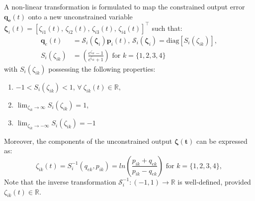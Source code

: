 \documentclass[lettersize,journal]{IEEEtran}
\begin{document}
A non-linear transformation is formulated to map the constrained output error $\boldsymbol{q_e}(t)$ onto a new unconstrained variable $\boldsymbol{\zeta}_i(t) = [\zeta_{i 1}(t),\, \zeta_{i 2}(t),\, \zeta_{i 3}(t),\, \zeta_{i 4}(t)]^{\top}$ such that:
\begin{align}
    \label{error transformation for inner loop: equation}
    \boldsymbol{q}_{e}(t) &= \mathcal{S}_i(\boldsymbol{\zeta}_i) \boldsymbol{p}_i(t), \, \mathcal{S}_i(\boldsymbol{\zeta}_i) = \text{diag}[S_i(\zeta_{ik})], \nonumber \\
    S_i(\zeta_{ik}) &= \left(\frac{e^{\zeta_{ik}} - 1}{e^{\zeta_{ik}} + 1} \right) \text{ for } k = \{1, 2, 3, 4\}
\end{align}
with $S_i(\zeta_{ik})$ possessing the following properties:
\begin{enumerate}
    \item[I.] $ -1 < S_i(\zeta_{ik}) < 1 $, $\forall~\zeta_{ik}(t) \in \mathbb{R},$ 
    \item[II.] $\lim_{\zeta_{ik} \to \infty} S_i(\zeta_{ik}) = 1$,
    \item[III.] $\lim_{\zeta_{ik} \to -\infty} S_i(\zeta_{ik}) = -1$
\end{enumerate}

Moreover, the components of the unconstrained output $\boldsymbol{\zeta(t)}$ can be expressed as:
\begin{equation} \label{inverse transformation function for inner loop}
    \zeta_{ik}(t) = S^{-1}_i(q_{e k}, p_{i k}) = ln \left(\frac{p_{i k} + q_{e k}}{p_{i k} - q_{e k}} \right) \text{ for } k = \{1, 2, 3, 4\},
\end{equation}
Note that the inverse transformation $\mathcal{S}_i^{-1}: (-1, 1) \to \mathbb{R}$ is well-defined, provided $\zeta_{ik}(t) \in \mathbb{R}$.
\end{document}
